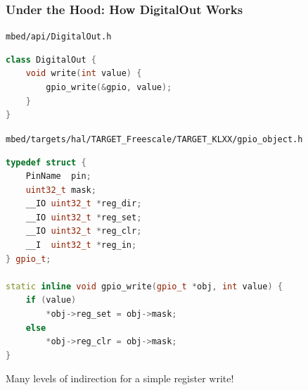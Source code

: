 \documentclass{beamer}
\begin{document}
\begin{frame}[fragile]
\frametitle{Under the Hood: How DigitalOut Works}
{\scriptsize \texttt{mbed/api/DigitalOut.h}}
\begin{lstlisting}[language=C++,basicstyle=\ttfamily\tiny]
class DigitalOut {
    void write(int value) {
        gpio_write(&gpio, value);
    }
}
\end{lstlisting}
{\scriptsize \texttt{mbed/targets/hal/TARGET\_Freescale/TARGET\_KLXX/gpio\_object.h}}
\begin{lstlisting}[language=C++,basicstyle=\ttfamily\tiny]
typedef struct {
    PinName  pin;
    uint32_t mask;
    __IO uint32_t *reg_dir;
    __IO uint32_t *reg_set;
    __IO uint32_t *reg_clr;
    __I  uint32_t *reg_in;
} gpio_t;

static inline void gpio_write(gpio_t *obj, int value) {
    if (value)
        *obj->reg_set = obj->mask;
    else
        *obj->reg_clr = obj->mask;
}
\end{lstlisting}
\vspace{5px}
Many levels of indirection for a simple register write!
\end{frame}
\end{document}
